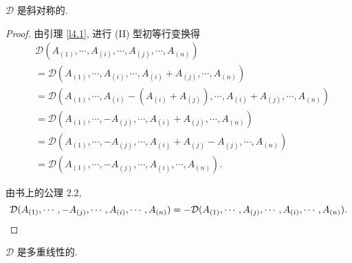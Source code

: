 \documentclass[color=black,device=normal,lang=cn,mode=geye]{elegantnote}
\begin{document}
\begin{theorem}[书上的公理 1.1]
    $\mathcal{D}$ 是斜对称的.
\end{theorem}
\begin{proof}
    由引理 \ref{l4.1}, 进行 (II) 型初等行变换得
    \begin{align*}
        & \mathcal{D}(A_{(1)},\cdots,A_{(i)},\cdots,A_{(j)},\cdots,A_{(n)}) \\
        & =\mathcal{D}(A_{(1)},\cdots,A_{(i)},\cdots,A_{(i)}+A_{(j)},\cdots,A_{(n)}) \\
        & =\mathcal{D}(A_{(1)},\cdots,A_{(i)}-(A_{(i)}+A_{(j)}),\cdots,A_{(i)}+A_{(j)},\cdots,A_{(n)}) \\
        & =\mathcal{D}(A_{(1)},\cdots,-A_{(j)},\cdots,A_{(i)}+A_{(j)},\cdots,A_{(n)}) \\
        & =\mathcal{D}(A_{(1)},\cdots,-A_{(j)},\cdots,A_{(i)}+A_{(j)}-A_{(j)},\cdots,A_{(n)}) \\
        & =\mathcal{D}(A_{(1)},\cdots,-A_{(j)},\cdots,A_{(i)},\cdots,A_{(n)}).
    \end{align*}

    由书上的公理 2.2,
    \[\mathcal{D}(A_{(1)},\cdots,-A_{(j)},\cdots,A_{(i)},\cdots,A_{(n)})=-\mathcal{D}(A_{(1)},\cdots,A_{(j)},\cdots,A_{(i)},\cdots,A_{(n)}).\qedhere\]
\end{proof}
\begin{theorem}[书上的公理 1.2]
    $\mathcal{D}$ 是多重线性的.
\end{theorem}
\end{document}
